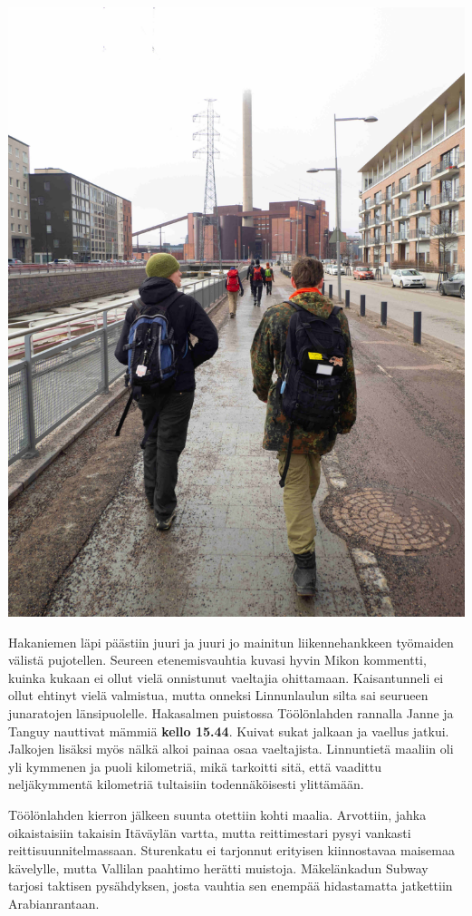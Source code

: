 \documentclass[10pt,finnish,a5paper,headings=small,twoside=semi]{scrartcl}
\begin{document}
\begin{multicols}{2}
	\noindent\includegraphics[width=\linewidth]{assets/nahkaliljakalasatama}

	Hakaniemen läpi päästiin juuri ja juuri jo mainitun liikennehankkeen
	työmaiden välistä pujotellen. Seureen etenemisvauhtia kuvasi hyvin
	Mikon kommentti, kuinka kukaan ei ollut vielä onnistunut vaeltajia
	ohittamaan. Kaisantunneli ei ollut ehtinyt vielä valmistua, mutta
	onneksi Linnunlaulun silta sai seurueen junaratojen länsipuolelle.
	Hakasalmen puistossa Töölönlahden rannalla Janne ja Tanguy nauttivat
	mämmiä \textbf{kello 15.44}. Kuivat sukat jalkaan ja vaellus jatkui.
	Jalkojen lisäksi myös nälkä alkoi painaa osaa vaeltajista. Linnuntietä
	maaliin oli yli kymmenen ja puoli kilometriä, mikä tarkoitti sitä, että
	vaadittu neljäkymmentä kilometriä tultaisiin todennäköisesti
	ylittämään.

	Töölönlahden kierron jälkeen suunta otettiin kohti maalia. Arvottiin,
	jahka oikaistaisiin takaisin Itäväylän vartta, mutta reittimestari
	pysyi vankasti reittisuunnitelmassaan. Sturenkatu ei tarjonnut
	erityisen kiinnostavaa maisemaa kävelylle, mutta Vallilan paahtimo
	herätti muistoja. Mäkelänkadun Subway tarjosi taktisen pysähdyksen,
	josta vauhtia sen enempää hidastamatta jatkettiin Arabianrantaan.


\end{multicols}
\end{document}
